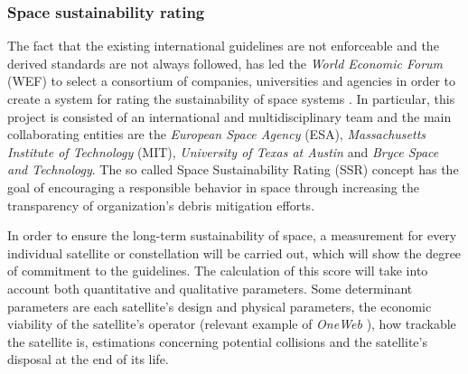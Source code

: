 \subsubsection{Space sustainability rating}
\bigskip
The fact that the existing international guidelines are not enforceable and the derived standards are not always followed, has led the \textit{World Economic Forum} (WEF) to select a consortium of companies, universities and agencies in order to create a system for rating the sustainability of space systems \cite{Space sustainability}. %
In particular, this project is consisted of an international and multidisciplinary team and the main collaborating entities are the \textit{European Space Agency} (ESA), \textit{Massachusetts Institute of Technology} (MIT), \textit{University of Texas at Austin} and \textit{Bryce Space and Technology}. The so called Space Sustainability Rating (SSR) concept has the goal of encouraging a responsible behavior in space through increasing the transparency of organization's debris mitigation efforts.

In order to ensure the long-term sustainability of space, a measurement for every individual satellite or constellation will be carried out, which will show the degree of commitment to the guidelines. 
The calculation of this score will take into account both quantitative and qualitative parameters. Some determinant parameters are each satellite's design and physical parameters, the economic viability of the satellite's operator (relevant example of \textit{OneWeb} \cite{Oneweb_bankruptcy, Cadman}), %
how trackable the satellite is, estimations concerning potential collisions and the satellite's disposal at the end of its life. 

